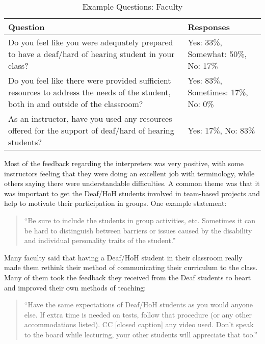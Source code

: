 \documentclass[conference]{IEEEtran}
\begin{document}
\begin{table}[h!]
\vspace{-0.05in}
\caption{Example Questions: Faculty}
\vspace{-0.1in}
\begin{center}
   \begin{tabular}{ p{22em} | p{10em} }

   Question  & Responses \\ \hline \hline
Do you feel like you were adequately prepared to have a deaf/hard of hearing student in your class? & Yes: 33\%, Somewhat: 50\%, No: 17\% \\ \hline
Do you feel like there were provided sufficient resources to address the needs of the student, both in and outside of the classroom? & Yes: 83\%, Sometimes: 17\%, No: 0\% \\ \hline
As an instructor, have you used any resources offered for the support of deaf/hard of hearing students? & Yes: 17\%, No: 83\% \\ \hline

    \end{tabular}
\end{center}

\label{table:facultyQuestions}
\vspace{-0.1in}
\end{table}

Most of the feedback regarding the interpreters was very positive, with some instructors feeling that they were doing an excellent job with terminology, while others saying there were understandable difficulties. A common theme was that it was important to get the Deaf/HoH students involved in team-based projects and help to motivate their participation in groups. One example statement:

\begin{quotation}
``Be sure to include the students in group activities, etc. Sometimes it can be hard to distinguish between barriers or issues caused by the disability and individual personality traits of the student.''
\end{quotation}

Many faculty said that having a Deaf/HoH student in their classroom really made them rethink their method of communicating their curriculum to the class. Many of them took the feedback they received from the Deaf students to heart and improved their own methods of teaching:

\begin{quotation}
``Have the same expectations of Deaf/HoH students as you would anyone else. If extra time is needed on tests, follow that procedure (or any other accommodations listed). CC [closed caption] any video used. Don't speak to the board while lecturing, your other students will appreciate that too.''
\end{quotation}
\end{document}
